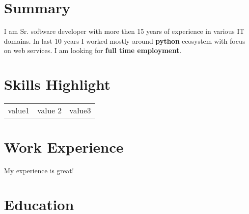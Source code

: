 \documentclass{article}
\begin{document}
    \section*{\textbf{Summary}}
    I am Sr. software developer with more then 15
    years of experience in various IT domains. In last 10 years I worked
    mostly around \textbf{python} ecosystem with focus on web services. I am looking
    for \textbf{full time employment}.


    \section*{\textbf{Skills Highlight}}
    \begin{center}
        \begin{tabular}{c c c }
            value1 & value 2 & value3
        \end{tabular}
    \end{center}

    \section*{\textbf{Work Experience}}
    My experience is great!

    \section*{\textbf{Education}}
\end{document}

